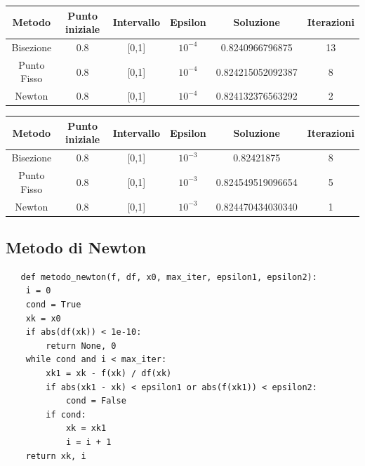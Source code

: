 \documentclass[11pt,a4paper]{article}
\begin{document}
\begin{table}[h!]
\centering
\begin{tabular}{|c|c|c|c|c|c|}
\hline
\textbf{Metodo} & \textbf{Punto iniziale} & \textbf{Intervallo} & \textbf{Epsilon} & \textbf{Soluzione} & \textbf{Iterazioni}  \\ \hline
 Bisezione   & 0.8   &  [0,1]  & \(10^{-4}\) & 0.8240966796875   & 13   \\ \hline
 Punto Fisso & 0.8   &  [0,1]  & \(10^{-4}\) & 0.824215052092387 & 8   \\ \hline
 Newton      & 0.8   &  [0,1]  & \(10^{-4}\) & 0.824132376563292 & 2    \\ \hline
\end{tabular}
\end{table}




\begin{table}[h!]
\centering
\begin{tabular}{|c|c|c|c|c|c|}
\hline
\textbf{Metodo} & \textbf{Punto iniziale} & \textbf{Intervallo} & \textbf{Epsilon} & \textbf{Soluzione} & \textbf{Iterazioni}  \\ \hline
 Bisezione   & 0.8   &  [0,1]  & \(10^{-3}\) & 0.82421875 & 8   \\ \hline
 Punto Fisso & 0.8   &  [0,1]  & \(10^{-3}\) & 0.824549519096654 & 5   \\ \hline
 Newton      & 0.8   &  [0,1]  & \(10^{-3}\) & 0.824470434030340 & 1    \\ \hline
\end{tabular}
\end{table}




\subsection*{Metodo di Newton}

\begin{verbatim}
   def metodo_newton(f, df, x0, max_iter, epsilon1, epsilon2):
    i = 0
    cond = True
    xk = x0
    if abs(df(xk)) < 1e-10:
        return None, 0
    while cond and i < max_iter:
        xk1 = xk - f(xk) / df(xk)
        if abs(xk1 - xk) < epsilon1 or abs(f(xk1)) < epsilon2:
            cond = False
        if cond:
            xk = xk1
            i = i + 1
    return xk, i
\end{verbatim}
\end{document}
